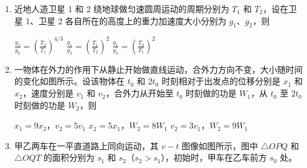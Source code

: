\documentclass[\gkver]{gaokaozhenti}
\begin{document}
\begin{enumerate}
\item
近地人造卫星 1 和 2 绕地球做匀速圆周运动的周期分别为 $T_{1}$ 和 $T_{2}$，设在卫星 1、卫星 2 各自所在的高度上的重力加速度大小分别为 $g_{1}$、$g_{2}$，则

{$\frac{g_{1}}{g_{2}}=\left(\frac{T_{2}}{T_{1}}\right)^{4/3}$}
{$\frac{g_{1}}{g_{2}}=\left(\frac{T_{1}}{T_{2}}\right)^{2}$}
{$\frac{g_{1}}{g_{2}}=\left(\frac{T_{2}}{T_{1}}\right)^{2}$}


\item
一物体在外力的作用下从静止开始做直线运动，合外力方向不变，大小随时间的变化如图所示。设该物体在 $t_{0}$ 和 $2t_{0}$ 时刻相对于出发点的位移分别是 $x_{1}$ 和 $x_{2}$，速度分别是 $v_{1}$ 和 $v_{2}$，合外力从开始至 $t_{0}$ 时刻做的功是 $W_{1}$，从 $t_{0}$ 至 $2t_{0}$ 时刻做的功是 $W_{2}$，则


{$x_{1}=9x_{2}$，$v_{2}=5v_{1}$}
{$x_{2}=5x_{1}$，$W_{2}=8W_{1}$}
{$v_{2}=3v_{1}$，$W_{2}=9W_{1}$}


\item
甲乙两车在一平直道路上同向运动，其 $v-t$ 图像如图所示，图中 $\triangle OPQ$ 和 $\triangle OQT$ 的面积分别为 $s_{1}$ 和 $s_{2}$（$s_{2}>s_{1}$），初始时，甲车在乙车前方 $s_{0}$ 处。


\end{enumerate}
\end{document}

